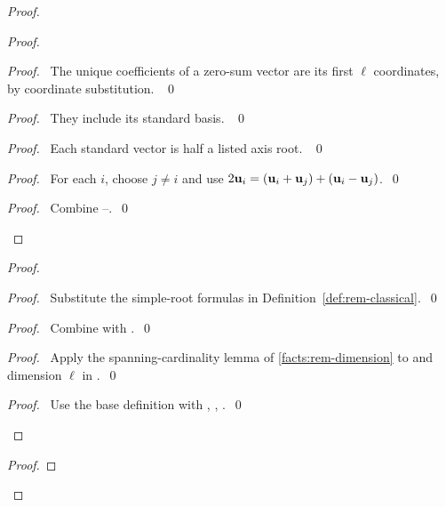\begin{proof}
\begin{proof}
\begin{proof}\pf\ The unique coefficients of a zero-sum vector are its
first $\ell$ coordinates, by coordinate substitution. ~\qed\end{proof}
\begin{proof}\pf\ They include its standard basis. ~\qed\end{proof}
\begin{proof}\pf\ Each standard vector is half a listed axis root. ~\qed\end{proof}
\begin{proof}\pf\ For each $i$, choose $j\ne i$ and use
$2{\mathbf u}_i=({\mathbf u}_i+{\mathbf u}_j)+({\mathbf u}_i-{\mathbf u}_j)$.~\qed\end{proof}
\qedstep
\begin{proof}\pf\ Combine --.~\qed\end{proof}
\end{proof}
\begin{proof}
\begin{proof}\pf\ Substitute the simple-root formulas in
Definition~\ref{def:rem-classical}.~\qed\end{proof}
\begin{proof}\pf\ Combine  with .~\qed\end{proof}
\begin{proof}\pf\ Apply the spanning-cardinality lemma of
\ref{facts:rem-dimension} to  and dimension
$\ell$ in .~\qed\end{proof}
\qedstep
\begin{proof}\pf\ Use the base definition with ,
, .~\qed\end{proof}
\end{proof}
\begin{proof}

\end{proof}
\end{proof}
